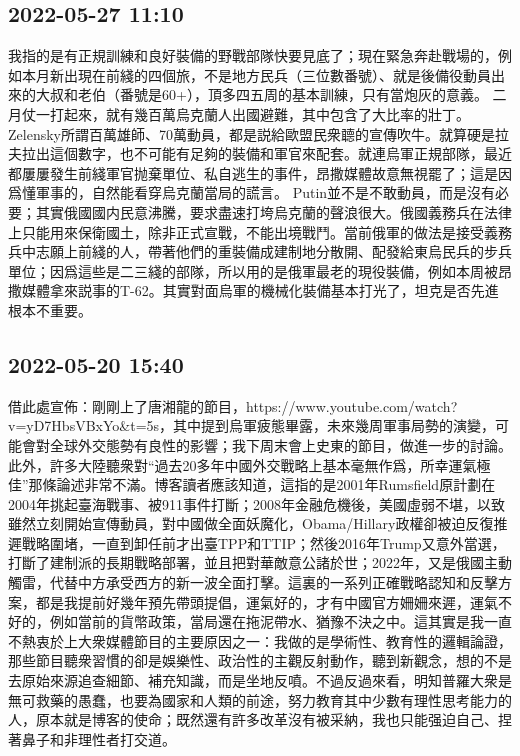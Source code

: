 \documentclass[twocolumn]{ctexart}
\begin{document}
\subsection*{2022-05-27 11:10}

我指的是有正規訓練和良好裝備的野戰部隊快要見底了；現在緊急奔赴戰場的，例如本月新出現在前綫的四個旅，不是地方民兵（三位數番號）、就是後備役動員出來的大叔和老伯（番號是60+），頂多四五周的基本訓練，只有當炮灰的意義。
二月仗一打起來，就有幾百萬烏克蘭人出國避難，其中包含了大比率的壯丁。Zelensky所謂百萬雄師、70萬動員，都是説給歐盟民衆聼的宣傳吹牛。就算硬是拉夫拉出這個數字，也不可能有足夠的裝備和軍官來配套。就連烏軍正規部隊，最近都屢屢發生前綫軍官抛棄單位、私自逃生的事件，昂撒媒體故意無視罷了；這是因爲懂軍事的，自然能看穿烏克蘭當局的謊言。
Putin並不是不敢動員，而是沒有必要；其實俄國國内民意沸騰，要求盡速打垮烏克蘭的聲浪很大。俄國義務兵在法律上只能用來保衛國土，除非正式宣戰，不能出境戰鬥。當前俄軍的做法是接受義務兵中志願上前綫的人，帶著他們的重裝備成建制地分散開、配發給東烏民兵的步兵單位；因爲這些是二三綫的部隊，所以用的是俄軍最老的現役裝備，例如本周被昂撒媒體拿來説事的T-62。其實對面烏軍的機械化裝備基本打光了，坦克是否先進根本不重要。
\subsection*{2022-05-20 15:40}

借此處宣佈：剛剛上了唐湘龍的節目，https://www.youtube.com/watch?v=yD7HbsVBxYo\&t=5s，其中提到烏軍疲態畢露，未來幾周軍事局勢的演變，可能會對全球外交態勢有良性的影響；我下周末會上史東的節目，做進一步的討論。
此外，許多大陸聽衆對“過去20多年中國外交戰略上基本毫無作爲，所幸運氣極佳”那條論述非常不滿。博客讀者應該知道，這指的是2001年Rumsfield原計劃在2004年挑起臺海戰事、被911事件打斷；2008年金融危機後，美國虛弱不堪，以致雖然立刻開始宣傳動員，對中國做全面妖魔化，Obama/Hillary政權卻被迫反復推遲戰略圍堵，一直到卸任前才出臺TPP和TTIP；然後2016年Trump又意外當選，打斷了建制派的長期戰略部署，並且把對華敵意公諸於世；2022年，又是俄國主動觸雷，代替中方承受西方的新一波全面打擊。這裏的一系列正確戰略認知和反擊方案，都是我提前好幾年預先帶頭提倡，運氣好的，才有中國官方姍姍來遲，運氣不好的，例如當前的貨幣政策，當局還在拖泥帶水、猶豫不決之中。這其實是我一直不熱衷於上大衆媒體節目的主要原因之一：我做的是學術性、教育性的邏輯論證，那些節目聽衆習慣的卻是娛樂性、政治性的主觀反射動作，聽到新觀念，想的不是去原始來源追查細節、補充知識，而是坐地反噴。不過反過來看，明知普羅大衆是無可救藥的愚蠢，也要為國家和人類的前途，努力教育其中少數有理性思考能力的人，原本就是博客的使命；既然還有許多改革沒有被采納，我也只能强迫自己、捏著鼻子和非理性者打交道。
\end{document}
